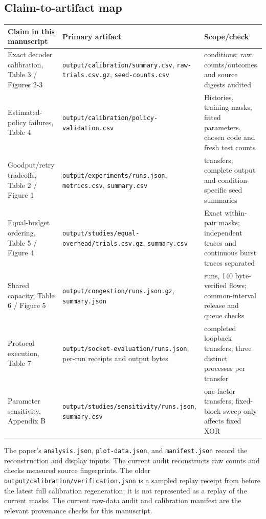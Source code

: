 \documentclass[11pt,a4paper]{article}
\begin{document}
\subsection{Claim-to-artifact map}
\begin{center}\footnotesize\setlength{\parskip}{0pt}
\begin{tabular}{>{\raggedright\arraybackslash}p{52.0mm}>{\raggedright\arraybackslash}p{52.0mm}>{\raggedright\arraybackslash}p{52.0mm}}
\toprule
\textbf{Claim in this manuscript} & \textbf{Primary artifact} & \textbf{Scope/check}\\\midrule
Exact decoder calibration, Table 3 / Figures 2-3 & \texttt{output/\allowbreak{}calibration/\allowbreak{}summary.csv}, \texttt{raw-\allowbreak{}trials.csv.gz}, \texttt{seed-\allowbreak{}counts.csv} & 153 conditions; raw counts/outcomes and source digests audited\\
Estimated-policy failures, Table 4 & \texttt{output/\allowbreak{}calibration/\allowbreak{}policy-\allowbreak{}validation.csv} & Histories, training masks, fitted parameters, chosen code and fresh test counts\\
Goodput/retry tradeoffs, Table 2 / Figure 1 & \texttt{output/\allowbreak{}experiments/\allowbreak{}runs.json}, \texttt{metrics.csv}, \texttt{summary.csv} & 260 transfers; complete output and condition-specific seed summaries\\
Equal-budget ordering, Table 5 / Figure 4 & \texttt{output/\allowbreak{}studies/\allowbreak{}equal-\allowbreak{}overhead/\allowbreak{}trials.csv.gz}, \texttt{summary.csv} & Exact within-pair masks; independent traces and continuous burst traces separated\\
Shared capacity, Table 6 / Figure 5 & \texttt{output/\allowbreak{}congestion/\allowbreak{}runs.json.gz}, \texttt{summary.json} & 70 runs, 140 byte-verified flows; common-interval release and queue checks\\
Protocol execution, Table 7 & \texttt{output/\allowbreak{}socket-\allowbreak{}evaluation/\allowbreak{}runs.json}, per-run receipts and output bytes & 36 completed loopback transfers; three distinct processes per transfer\\
Parameter sensitivity, Appendix B & \texttt{output/\allowbreak{}studies/\allowbreak{}sensitivity/\allowbreak{}runs.json}, \texttt{summary.csv} & 370 one-factor transfers; fixed-block sweep only affects fixed XOR\\
\bottomrule\end{tabular}\end{center}
The paper's \texttt{analysis.json}, \texttt{plot-\allowbreak{}data.json}, and \texttt{manifest.json} record the reconstruction and display inputs. The current audit reconstructs raw counts and checks measured source fingerprints. The older \texttt{output/\allowbreak{}calibration/\allowbreak{}verification.json} is a sampled replay receipt from before the latest full calibration regeneration; it is not represented as a replay of the current masks. The current raw-data audit and calibration manifest are the relevant provenance checks for this manuscript.
\end{document}
